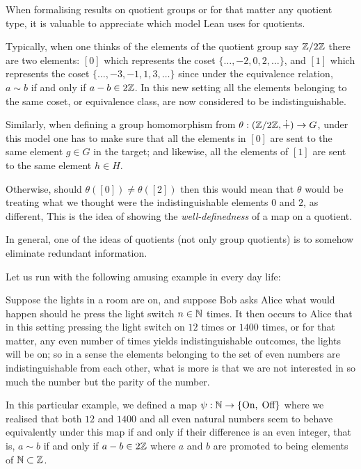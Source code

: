     \begin{remark}
    When formalising results on quotient groups or for that matter any quotient type, it is valuable to appreciate which model Lean uses for quotients. 
    
    Typically, when one thinks of the elements of the quotient group say $\mathbb{Z}/2\mathbb{Z}$ there are two elements: 
    $[0]$ which represents the coset $\{\ldots, -2, 0, 2, \ldots\}$, and $[1]$ which represents the coset $\{\ldots, -3, -1, 1, 3, \ldots\}$
    since under the equivalence relation, $a \sim b$ if and only if $a - b \in 2\mathbb{Z}$. In this new setting all the elements belonging to the same coset, 
    or equivalence class, are now considered to be indistinguishable.

    Similarly, when defining a group homomorphism from $\theta : (\mathbb{Z} /2\mathbb{Z}, \dot{+}) \rightarrow G$, under this model one has to make sure that
    all the elements in $[0]$ are sent to the same element $g \in G$ in the target; and likewise, all the elements of $[1]$ are sent to the same element $h \in H$.

    Otherwise, should $\theta([0]) \ne \theta([2])$ then this would mean that $\theta$ would be treating what we thought were the indistinguishable elements $0$ and $2$, as different,
    This is the idea of showing the \textit{well-definedness} of a map on a quotient.

    In general, one of the ideas of quotients (not only group quotients) is to somehow eliminate redundant information.

    Let us run with the following amusing example in every day life:
    
    Suppose the lights in a room are on, and suppose Bob asks Alice what would happen should he press the light switch $n \in \mathbb{N}$ times. It then occurs to
    Alice that in this setting pressing the light switch on $12$ times or $1400$ times, or for that matter, any even number of times yields indistinguishable outcomes,
     the lights will be on; so in a sense the elements belonging to the set of even numbers are indistinguishable from each other, 
     what is more is that we are not interested in so much the number but the parity of the number.

    In this particular example, we defined a map $\psi : \mathbb{N} \rightarrow \{\text{On}, \; \text{Off}\}$ where we realised
    that both $12$ and $1400$ and all even natural numbers seem to behave equivalently under this map if and only if their difference is an even integer,
    that is, $a \sim b$ if and only if $a - b \in 2\mathbb{Z}$ where $a$ and $b$ are promoted to being elements of $\mathbb{N} \subset \mathbb{Z}$.    
    

\end{remark}
